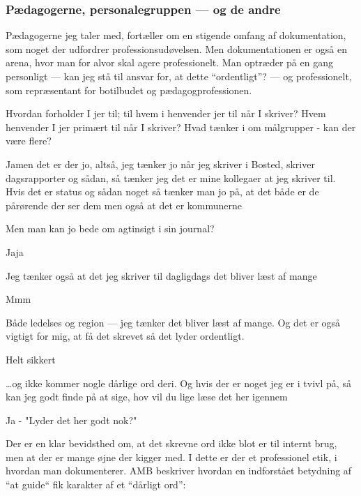 \subsubsection{Pædagogerne, personalegruppen — og de andre}

Pædagogerne jeg taler med, fortæller om en stigende omfang af dokumentation, som noget der udfordrer professionsudøvelsen.
Men dokumentationen er også en arena, hvor man for alvor skal agere professionelt.
Man optræder på en gang personligt — kan jeg stå til ansvar for, at dette “ordentligt”? — og professionelt, som repræsentant for botilbudet og pædagogprofessionen.

\begin{description}

\MAA
Hvordan forholder I jer til; til hvem i henvender jer til når I skriver?
Hvem henvender I jer primært til når I skriver?
Hvad tænker i om målgrupper - kan der være flere?

\DMC
Jamen det er der jo, altså, jeg tænker jo når jeg skriver i Bosted, skriver dagsrapporter og sådan, så tænker jeg det er mine kollegaer at jeg skriver til.
Hvis det er status og sådan noget så tænker man jo på, at det både er de pårørende der ser dem men også at det er kommunerne

\MAA
Men man kan jo bede om agtinsigt i sin journal?

\DMC
Jaja

\AMB
Jeg tænker også at det jeg skriver til dagligdags det bliver læst af mange

\DMC
Mmm

\AMB
Både ledelses og region — jeg tænker det bliver læst af mange.
Og det er også vigtigt for mig, at få det skrevet så det lyder ordentligt.

\DMC
Helt sikkert

\AMB
\ldots og ikke kommer nogle dårlige ord deri.
Og hvis der er noget jeg er i tvivl på, så kan jeg godt finde på at sige, hov vil du lige læse det her igennem

\DMC
Ja - "Lyder det her godt nok?"
\end{description}

Der er en klar bevidsthed om, at det skrevne ord ikke blot er til internt brug, men at der er mange øjne der kigger med.
I dette er der et professionel etik, i hvordan man dokumenterer.
AMB beskriver hvordan en indforstået betydning af “at guide“ fik karakter af et “dårligt ord”:


